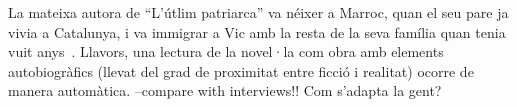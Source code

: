 La mateixa autora de ``L'útlim patriarca'' va néixer a Marroc, quan el seu pare ja vivia a Catalunya, i va immigrar a Vic amb la resta de la seva família quan tenia vuit anys~\autocite{Vidal2012}.
Llavors, una lectura de la novel·la com obra amb elements autobiogràfics (llevat del grad de proximitat entre ficció i realitat) ocorre de manera automàtica.
--compare with interviews!!
Com s'adapta la gent?


\begin{comment}

La població estrangera a Catalunya (APUNTS de prospectiva territorial, numero 2)

--> discuteix la població estrangera i el seu desenvolupament en el periode de 2000-2013
analitza la distribució territorial

"a partir de la dècada de 1980 es produexien diverses onades migratòries del nord d'Àfrica"
--> ich glaube, mein Roman faellt hier rein; nach meinen Berechnungen sind sie Anfang der 90ern nach Catalunya gekommen

"A Catalunya [...] El primer contigent són els africans (27.5\%), la gran majoria marroquins (20.4\% del total d'immigrants a Catalunya)."

"El col·lectiu procedent del Marroc ha estat el més important des dels inicis de la immigració estrangera recent a Catalunya, tant pel nombre com per la seva distribució en el territori."

"El marroquins, segon grup de la província, presenta una migració més masculina en els grups de més edat (majors de 35 anys), però equilibrada en les edat inferiors. Destaca especialment l'important volum de població infantil: el 14,6\% dels marroquins tenen menys de 5 anys."

relevància per a mi:
trets/dades històrics serveixen com a base per la història

------------------------

[Candel1965]

Els altres catalans

"On hi ha feina, hi són ells" (p.17)
"A la terra dels seus pares no hi ha feina" (p.17)
"Se senten conquistats per Catalunya; no del tot, és clar [...] si els diuen murcians o gallecs s'enfaden; si els diuen catalans, no" (p.17)
"Davant la persistent i discutida qüestió: "...heu vingut a menjar-vos el pa dels catalans..." es posen furiosos, naturalmen! i aleshores, només aleshores, malparlen de Catalunya. A ells no els el regala ningú, el pa; ells se'l suen;" (p.17)


\end{comment}
